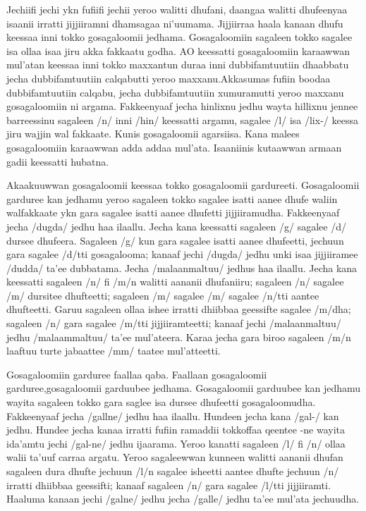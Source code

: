 \documentclass[11pt,b5paper]{book}
\begin{document}
\begin{itemize}
Jechiifi jechi ykn fufiifi jechii yeroo walitti dhufani, daangaa  walitti dhufeenyaa isaanii irratti jijjiiramni dhamsagaa  ni’uumama. Jijjiirraa haala kanaan dhufu keessaa inni tokko  gosagaloomii jedhama. Gosagaloomiin sagaleen tokko sagalee  isa ollaa isaa jiru akka fakkaatu godha. AO keessatti  gosagaloomiin karaawwan mul’atan keessaa inni tokko  maxxantun duraa inni dubbifamtuutiin dhaabbatu jecha  dubbifamtuutiin calqabutti yeroo maxxanu.Akkasumas fufiin  boodaa dubbifamtuutiin calqabu, jecha dubbifamtuutiin  xumuramutti yeroo maxxanu gosagaloomiin ni  argama. Fakkeenyaaf jecha hinlixnu jedhu wayta hillixnu  jennee barreessinu sagaleen /n/ inni /hin/ keessatti argamu,  sagalee /l/ isa /lix-/ keessa jiru wajjin wal fakkaate. Kunis  gosagaloomii agarsiisa. Kana malees gosagaloomiin karaawwan  adda addaa mul'ata. Isaaniinis kutaawwan armaan gadii  keessatti hubatna. 

Akaakuuwwan gosagaloomii keessaa tokko gosagaloomii  gardureeti. Gosagaloomii garduree kan jedhamu yeroo sagaleen  tokko sagalee isatti aanee dhufe waliin walfakkaate ykn gara sagalee isatti aanee dhufetti jijjiiramudha. Fakkeenyaaf jecha /dugda/ jedhu haa ilaallu. Jecha kana keessatti sagaleen /g/ sagalee /d/ dursee dhufeera. Sagaleen /g/ kun gara sagalee isatti aanee dhufeetti, jechuun gara sagalee /d/tti gosagalooma; kanaaf jechi /dugda/ jedhu unki isaa jijjiiramee /dudda/ ta'ee dubbatama. Jecha /malaanmaltuu/ jedhus haa ilaallu. Jecha kana keessatti sagaleen /n/ fi /m/n walitti aananii dhufaniiru; sagaleen /n/ sagalee /m/ dursitee dhufteetti; sagaleen /m/ sagalee /m/ sagalee /n/tti aantee dhufteetti. Garuu sagaleen ollaa ishee irratti dhiibbaa geessifte sagalee /m/dha; sagaleen /n/ gara sagalee /m/tti jijjiiramteetti; kanaaf jechi /malaanmaltuu/ jedhu /malaammaltuu/ ta'ee mul'ateera. Karaa jecha gara biroo sagaleen /m/n laaftuu turte jabaattee /mm/ taatee mul'atteetti.

Gosagaloomiin garduree faallaa qaba. Faallaan gosagaloomii garduree,gosagaloomii garduubee jedhama. Gosagaloomii garduubee kan jedhamu wayita  sagaleen tokko gara saglee isa dursee dhufeetti  gosagaloomudha. Fakkeenyaaf jecha /gallne/ jedhu haa ilaallu. Hundeen jecha kana /gal-/ kan jedhu. Hundee jecha kanaa irratti fufiin ramaddii tokkoffaa qeentee {-ne} wayita ida'amtu jechi /gal-ne/ jedhu ijaarama. Yeroo kanatti sagaleen /l/ fi /n/ ollaa walii ta'uuf carraa argatu. Yeroo sagaleewwan kunneen walitti aananii dhufan sagaleen dura dhufte jechuun /l/n sagalee isheetti aantee dhufte jechuun /n/ irratti dhiibbaa geessifti; kanaaf sagaleen /n/ gara sagalee /l/tti jijjiiramti. Haaluma kanaan jechi /galne/ jedhu jecha /galle/ jedhu ta'ee mul'ata jechuudha.


\end{itemize}
\end{document}
